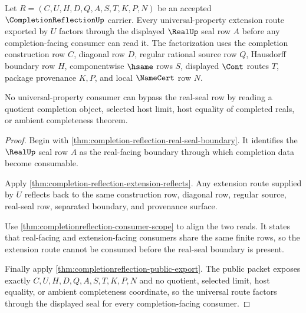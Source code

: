 \begin{theorem}
\label{thm:completionreflection-universal-real-seal-factorization}
Let $R=(C,U,H,D,Q,A,S,T,K,P,N)$ be an accepted $\CompletionReflectionUp$ carrier. Every universal-property extension route exported by $U$ factors through the displayed $\RealUp$ seal row $A$ before any completion-facing consumer can read it. The factorization uses the completion construction row $C$, diagonal row $D$, regular rational source row $Q$, Hausdorff boundary row $H$, componentwise $\hsame$ rows $S$, displayed $\Cont$ routes $T$, package provenance $K,P$, and local $\NameCert$ row $N$.

No universal-property consumer can bypass the real-seal row by reading a quotient completion object, selected host limit, host equality of completed reals, or ambient completeness theorem.
\end{theorem}
\begin{proof}
Begin with \autoref{thm:completion-reflection-real-seal-boundary}. It identifies the $\RealUp$ seal row $A$ as the real-facing boundary through which completion data become consumable.

Apply \autoref{thm:completion-reflection-extension-reflects}. Any extension route supplied by $U$ reflects back to the same construction row, diagonal row, regular source, real-seal row, separated boundary, and provenance surface.

Use \autoref{thm:completionreflection-consumer-scope} to align the two reads. It states that real-facing and extension-facing consumers share the same finite rows, so the extension route cannot be consumed before the real-seal boundary is present.

Finally apply \autoref{thm:completionreflection-public-export}. The public packet exposes exactly $C,U,H,D,Q,A,S,T,K,P,N$ and no quotient, selected limit, host equality, or ambient completeness coordinate, so the universal route factors through the displayed seal for every completion-facing consumer.
\end{proof}

